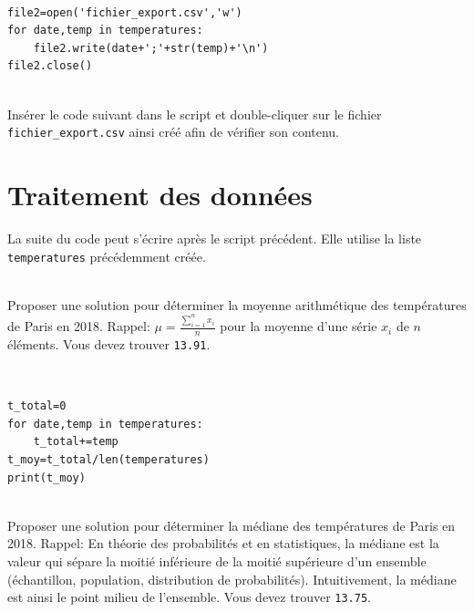 \begin{solution}~\ \\
\begin{verbatim}
file2=open('fichier_export.csv','w')
for date,temp in temperatures:
    file2.write(date+';'+str(temp)+'\n')
file2.close()
\end{verbatim}
\end{solution}

\begin{exercice}~\\
Insérer le code suivant dans le script et double-cliquer sur le fichier \verb?fichier_export.csv? ainsi créé afin de vérifier son contenu.
\end{exercice}

\section{Traitement des données}

La suite du code peut s'écrire après le script précédent. Elle utilise la liste \verb?temperatures? précédemment créée.

\begin{exercice}~\\
Proposer une solution pour déterminer la moyenne arithmétique des températures de Paris en 2018. Rappel: $\mu=\frac{\sum\limits_{i=1}^{n} x_i}{n}$ pour la moyenne d'une série $x_i$ de $n$ éléments. Vous devez trouver \verb?13.91?.
\end{exercice}

\begin{solution}~\ \\
\begin{verbatim}
t_total=0
for date,temp in temperatures:
    t_total+=temp
t_moy=t_total/len(temperatures)
print(t_moy)
\end{verbatim}
\end{solution}

\begin{exercice}~\\
Proposer une solution pour déterminer la médiane des températures de Paris en 2018. Rappel: En théorie des probabilités et en statistiques, la médiane est la valeur qui sépare la moitié inférieure de la moitié supérieure d'un ensemble (échantillon, population, distribution de probabilités). Intuitivement, la médiane est ainsi le point milieu de l'ensemble. Vous devez trouver \verb?13.75?.
\end{exercice}

